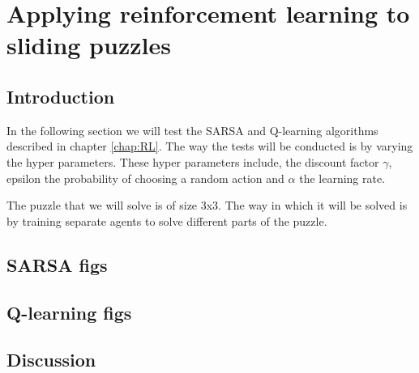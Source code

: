 \graphicspath{{Experiments\_and\_Results/fig}}

\chapter{Applying reinforcement learning to sliding puzzles}
\label{chap:Experiments_and_Results}
\section{Introduction}
In the following section we will test the SARSA and Q-learning algorithms described in chapter \ref{chap:RL}. The way the tests will be conducted is by varying the hyper parameters. These hyper parameters include, the discount factor $\gamma$, epsilon the probability of choosing a random action and $\alpha$ the learning rate.

The puzzle that we will solve is of size 3x3. The way in which it will be solved is by training separate agents to solve different parts of the puzzle. 
\section{SARSA figs}

\section{Q-learning figs}

\section{Discussion}

